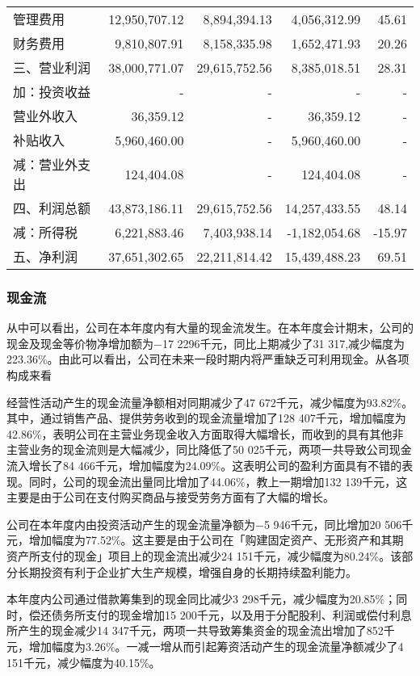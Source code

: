 \begin{longtable}{>{\footnotesize}l>{\footnotesize}r>{\footnotesize}r>{\footnotesize}r>{\footnotesize}r}
\qquad\quad 管理费用 & 12,950,707.12 & 8,894,394.13 & 4,056,312.99 & 45.61\\
\qquad\quad 财务费用 & 9,810,807.91 & 8,158,335.98 & 1,652,471.93 & 20.26\\
三、营业利润 & 38,000,771.07 & 29,615,752.56 & 8,385,018.51 & 28.31\\
        \quad 加：投资收益 & - & - & -	 & - \\
\qquad\quad 营业外收入 & 36,359.12 & - & 36,359.12	 & -\\
\qquad\quad 补贴收入 & 5,960,460.00 & - & 5,960,460.00 & - 	\\
       \quad 减：营业外支出 & 124,404.08	& - & 124,404.08 & 	- \\
四、利润总额 & 43,873,186.11 & 29,615,752.56 & 14,257,433.55 & 48.14\\
       \quad 减：所得税 & 6,221,883.46 & 7,403,938.14 & -1,182,054.68 & -15.97\\
五、净利润 & 37,651,302.65 & 22,211,814.42 & 15,439,488.23 & 69.51\\
	\bottomrule
	\end{longtable}\label{lirun}
\subsubsection{现金流}{}
从中可以看出，公司在本年度内有大量的现金流发生。在本年度会计期末，公司的现金及现金等价物净增加额为$-$17 2296千元，同比上期减少了31 317,减少幅度为223.36\%。由此可以看出，公司在未来一段时期内将严重缺乏可利用现金。从各项构成来看
\begin{compactenum}[(1) ]
 \item 经营性活动产生的现金流量净额相对同期减少了47 672千元，减少幅度为93.82\%。其中，通过销售产品、提供劳务收到的现金流量增加了128 407千元，增加幅度为42.86\%，表明公司在主营业务现金收入方面取得大幅增长，而收到的具有其他非主营业务的现金流则是大幅减少，同比降低了50 025千元，两项一共导致公司现金流入增长了84 466千元，增加幅度为24.09\%。这表明公司的盈利方面具有不错的表现。同时，公司的现金流出量同比增加了44.06\%，教上一期增加132 139千元，这主要是由于公司在支付购买商品与接受劳务方面有了大幅的增长。
 \item 公司在本年度内由投资活动产生的现金流量净额为$-$5 946千元，同比增加20 506千元，增加幅度为77.52\%。这主要是由于公司在「购建固定资产、无形资产和其期资产所支付的现金」项目上的现金流出减少24 151千元，减少幅度为80.24\%。该部分长期投资有利于企业扩大生产规模，增强自身的长期持续盈利能力。
 \item 本年度内公司通过借款筹集到的现金同比减少3 298千元，减少幅度为20.85\%；同时，偿还债务所支付的现金增加15 200千元，以及用于分配股利、利润或偿付利息所产生的现金减少14 347千元，两项一共导致筹集资金的现金流出增加了852千元，增加幅度为3.26\%。一减一增从而引起筹资活动产生的现金流量净额减少了4 151千元，减少幅度为40.15\%。
\end{compactenum}



